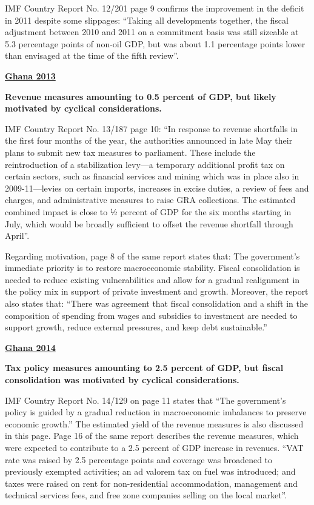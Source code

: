 IMF Country Report No. 12/201 page 9 confirms the improvement in the deficit in 2011 despite some slippages: “Taking all developments together, the fiscal adjustment between 2010 and 2011 on a commitment basis was still sizeable at 5.3 percentage points of non-oil GDP, but was about 1.1 percentage points lower than envisaged at the time of the fifth review”.

\textbf{\underline{Ghana 2013}}

\textbf{Revenue measures amounting to 0.5 percent of GDP, but likely motivated by cyclical considerations.}

IMF Country Report No. 13/187 page 10: “In response to revenue shortfalls in the first four months of the year, the authorities announced in late May their plans to submit new tax measures to parliament. These include the reintroduction of a stabilization levy—a temporary additional profit tax on certain sectors, such as financial services and mining which was in place also in 2009-11—levies on certain imports, increases in excise duties, a review of fees and charges, and administrative measures to raise GRA collections. The estimated combined impact is close to ½ percent of GDP for the six months starting in July, which would be broadly sufficient to offset the revenue shortfall through April”.

Regarding motivation, page 8 of the same report states that: The government’s immediate priority is to restore macroeconomic stability. Fiscal consolidation is needed to reduce existing vulnerabilities and allow for a gradual realignment in the policy mix in support of private investment and growth. Moreover, the report also states that: “There was agreement that fiscal consolidation and a shift in the composition of spending from wages and subsidies to investment are needed to support growth, reduce external pressures, and keep debt sustainable.”

\textbf{\underline{Ghana 2014}}

\textbf{Tax policy measures amounting to 2.5 percent of GDP, but fiscal consolidation was motivated by cyclical considerations.} 

IMF Country Report No. 14/129 on page 11 states that “The government’s policy is guided by a gradual reduction in macroeconomic imbalances to preserve economic growth.” The estimated yield of the revenue measures is also discussed in this page. 
Page 16 of the same report describes the revenue measures, which were expected to contribute to a 2.5 percent of GDP increase in revenues. “VAT rate was raised by 2.5 percentage points and coverage was broadened to previously exempted activities; an ad valorem tax on fuel was introduced; and taxes were raised on rent for non-residential accommodation, management and technical services fees, and free zone companies selling on the local market”.

